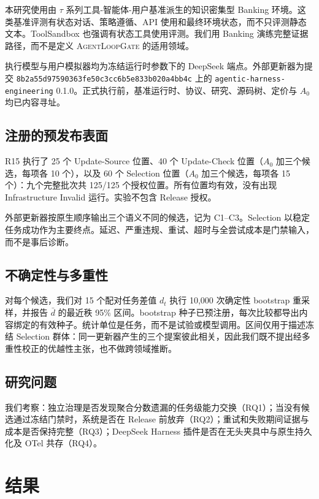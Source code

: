 \documentclass[UTF8,10pt,twocolumn,fontset=none]{ctexart}
\newcommand{\system}{\textsc{AgentLoopGate}\xspace}
\newcommand{\code}[1]{\texttt{#1}}
\begin{document}
本研究使用由 $\tau$ 系列工具-智能体-用户基准派生的知识密集型 Banking 环境。这类基准评测有状态对话、策略遵循、API 使用和最终环境状态，而不只评测静态文本\cite{yao2024taubench}。ToolSandbox 也强调有状态工具使用评测\cite{lu2024toolsandbox}。我们用 Banking 演练完整证据路径，而不是定义 \system 的适用领域。

执行模型与用户模拟器均为冻结运行时参数下的 DeepSeek 端点。外部更新器为提交 \code{8b2a55d97590363fe50c3cc6b5e833b020a4bb4c} 上的 \code{agentic-harness-engineering} 0.1.0。正式执行前，基准运行时、协议、研究、源码树、定价与 $A_0$ 均已内容寻址。

\subsection{注册的预发布表面}

R15 执行了 25 个 Update-Source 位置、40 个 Update-Check 位置（$A_0$ 加三个候选，每项各 10 个），以及 60 个 Selection 位置（$A_0$ 加三个候选，每项各 15 个）：九个完整批次共 125/125 个授权位置。所有位置均有效，没有出现 Infrastructure Invalid 运行。实验不包含 Release 授权。

外部更新器按原生顺序输出三个语义不同的候选，记为 C1--C3。Selection 以稳定任务成功作为主要终点。延迟、严重违规、重试、超时与全尝试成本是门禁输入，而不是事后诊断。

\subsection{不确定性与多重性}

对每个候选，我们对 15 个配对任务差值 $d_t$ 执行 10,000 次确定性 bootstrap 重采样，并报告 $\bar d$ 的最近秩 95\% 区间。bootstrap 种子已预注册，每次比较都导出内容绑定的有效种子。统计单位是任务，而不是试验或模型调用\cite{efron1979bootstrap}。区间仅用于描述冻结 Selection 群体：同一更新器产生的三个提案彼此相关，因此我们既不提出经多重性校正的优越性主张，也不做跨领域推断。

\subsection{研究问题}

我们考察：独立治理是否发现聚合分数遗漏的任务级能力交换（RQ1）；当没有候选通过冻结门禁时，系统是否在 Release 前放弃（RQ2）；重试和失败期间证据与成本是否保持完整（RQ3）；DeepSeek Harness 插件是否在无头夹具中与原生持久化及 OTel 共存（RQ4）。

\section{结果}
\end{document}
